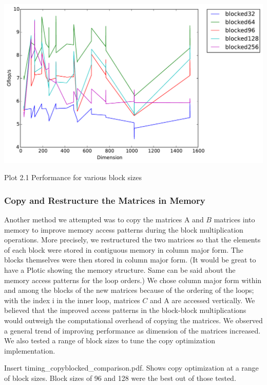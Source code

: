 \documentclass[12pt]{article}
\begin{document}
\begin{center}
\includegraphics[width=16cm]{timing_blocked_comparison.pdf}

Plot 2.1 Performance for various block sizes
\end{center}


\subsubsection{Copy and Restructure the Matrices in Memory}

Another method we attempted was to copy the matrices A and $B$ matrices into memory to improve memory access patterns during the block multiplication operations. More precisely, we restructured the two matrices so that the elements of each block were stored in contiguous memory in column major form. The blocks themselves were then stored in column major form. (It would be great to have a Plotic showing the memory structure. Same can be said about the memory access patterns for the loop orders.) We chose column major form within and among the blocks of the new matrices because of the ordering of the loops; with the index i in the inner loop, matrices $C$ and A are accessed vertically. We believed that the improved access patterns in the block-block multiplications would outweigh the computational overhead of copying the matrices. We observed a general trend of improving performance as dimension of the matrices increased. We also tested a range of block sizes to tune the copy optimization implementation. 

Insert timing\_copyblocked\_comparison.pdf. Shows copy optimization at a range of block sizes. Block sizes of 96 and 128 were the best out of those tested.
\end{document}
